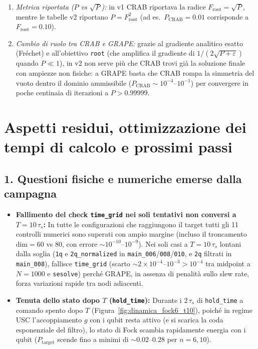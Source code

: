 \documentclass[11pt,a4paper]{article}
\begin{document}
\begin{itemize}
\begin{enumerate}
        \item \emph{Metrica riportata ($P$ vs $\sqrt{P}$):} in v1 CRAB riportava la radice $F_{\text{root}} = \sqrt{P}$, mentre le tabelle v2 riportano $P = F_{\text{root}}^2$ (ad es.\ $P_{\text{CRAB}} = 0.01$ corrisponde a $F_{\text{root}} = 0.10$).
        \item \emph{Cambio di ruolo tra CRAB e GRAPE:} grazie al gradiente analitico esatto (Fréchet) e all'obiettivo \texttt{root} (che amplifica il gradiente di $1/(2\sqrt{P+\varepsilon})$ quando $P \ll 1$), in v2 non serve più che CRAB trovi già la soluzione finale con ampiezze non fisiche: a GRAPE basta che CRAB rompa la simmetria del vuoto dentro il dominio ammissibile ($P_{\text{CRAB}} \sim 10^{-4}\text{--}10^{-1}$) per convergere in poche centinaia di iterazioni a $P > 0.99999$.
    \end{enumerate}
\end{itemize}

\section{Aspetti residui, ottimizzazione dei tempi di calcolo e prossimi passi}

\subsection*{1. Questioni fisiche e numeriche emerse dalla campagna}
\begin{itemize}
    \item \textbf{Fallimento del check \texttt{time\_grid} nei soli tentativi non conversi a $T=10\,\tau_s$:}
    In tutte le configurazioni che raggiungono il target tutti gli 11 controlli numerici sono superati con ampio margine (incluso il troncamento $\text{dim}=60$ vs $80$, con errore $\sim 10^{-10}\text{--}10^{-9}$). Nei soli casi a $T=10\,\tau_s$ lontani dalla soglia (\texttt{1q} e \texttt{2q\_normalized} in \texttt{main\_006}/\texttt{008}/\texttt{010}, e \texttt{2q} filtrati in \texttt{main\_008}), fallisce \texttt{time\_grid} (scarto $\sim 2\times 10^{-4}\text{--}10^{-3} > 10^{-4}$ tra midpoint a $N=1000$ e \texttt{sesolve}) perché GRAPE, in assenza di penalità sullo slew rate, forza variazioni rapide tra nodi adiacenti.
    \item \textbf{Tenuta dello stato dopo $T$ (\texttt{hold\_time}):}
    Durante i $2\,\tau_s$ di \texttt{hold\_time} a comando spento dopo $T$ (Figura~\ref{fig:dinamica_fock6_t10}), poiché in regime USC l'accoppiamento $g$ con i qubit resta attivo (e si scarica la coda esponenziale del filtro), lo stato di Fock scambia rapidamente energia con i qubit ($P_{\text{target}}$ scende fino a minimi di $\sim 0.02\text{--}0.28$ per $n=6, 10$).
\end{itemize}
\end{document}
